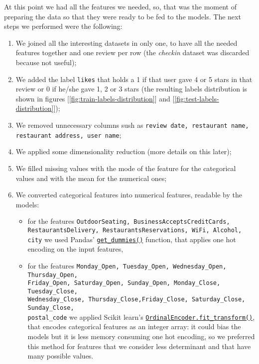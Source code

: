 At this point we had all the features we needed, so, that was the moment of preparing the data so that they were ready to be fed to the models. The next steps we performed were the following:
\begin{enumerate}
	\item We joined all the interesting datasets in only one, to have all the needed features together and one review per row (the \textit{checkin} dataset was discarded because not useful);
	\item We added the label \texttt{likes} that holds a 1 if that user gave 4 or 5 stars in that review or 0 if he/she gave 1, 2 or 3 stars (the resulting labels distribution is shown in figures [\ref{fig:train-labels-distribution}] and [\ref{fig:test-labels-distribution}]);
	\item We removed unnecessary columns sush as \texttt{review date, restaurant name, restaurant address, user name};
	\item We applied some dimensionality reduction (more details on this later);
	\item We filled missing values with the mode of the feature for the categorical values and with the mean for the numerical ones;
	\item We converted categorical features into numerical features, readable by the models:
	\begin{itemize}
		\item for the features \texttt{OutdoorSeating, BusinessAcceptsCreditCards, RestaurantsDelivery, RestaurantsReservations, WiFi, Alcohol, city} we used Pandas' \href{https://pandas.pydata.org/pandas-docs/stable/reference/api/pandas.get_dummies.html}{\texttt{get\_dummies()}} function, that applies one hot encoding on the input features,
		\item for the features \texttt{Monday\_Open, Tuesday\_Open, Wednesday\_Open, Thursday\_Open,\\ Friday\_Open, Saturday\_Open, Sunday\_Open, Monday\_Close, Tuesday\_Close,\\ Wednesday\_Close, Thursday\_Close,Friday\_Close, Saturday\_Close, Sunday\_Close,\\ postal\_code} we applied Scikit learn's \href{https://scikit-learn.org/stable/modules/generated/sklearn.preprocessing.OrdinalEncoder.html}{\texttt{OrdinalEncoder.fit\_transform()}}, that encodes categorical features as an integer array: it could bias the models but it is less memory consuming \wrt one hot encoding, so we preferred this method for features that we consider less determinant and that have many possible values.
	\end{itemize}
\end{enumerate}

